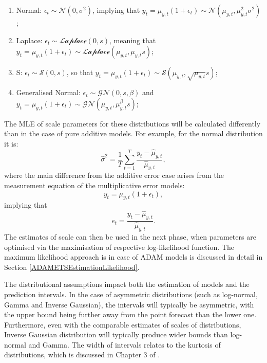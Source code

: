 \documentclass[
]{book}
\providecommand{\tightlist}{%
  \setlength{\itemsep}{0pt}\setlength{\parskip}{0pt}}
\theoremstyle{definition}
\theoremstyle{definition}
\theoremstyle{definition}
\theoremstyle{definition}
\theoremstyle{remark}
\begin{document}
\begin{enumerate}
\def\labelenumi{\arabic{enumi}.}
\tightlist
\item
  Normal: \(\epsilon_t \sim \mathcal{N}(0, \sigma^2)\), implying that \(y_t = \mu_{y,t} (1+\epsilon_t) \sim \mathcal{N}(\mu_{y,t}, \mu_{y,t}^2 \sigma^2)\);
\item
  Laplace: \(\epsilon_t \sim \mathcal{Laplace}(0, s)\), meaning that \(y_t = \mu_{y,t} (1+\epsilon_t) \sim \mathcal{Laplace}(\mu_{y,t}, \mu_{y,t} s)\);
\item
  S: \(\epsilon_t \sim \mathcal{S}(0, s)\), so that \(y_t = \mu_{y,t} (1+\epsilon_t) \sim \mathcal{S}(\mu_{y,t}, \sqrt{\mu_{y,t}} s)\);
\item
  Generalised Normal: \(\epsilon_t \sim \mathcal{GN}(0, s, \beta)\) and \(y_t = \mu_{y,t} (1+\epsilon_t) \sim \mathcal{GN}(\mu_{y,t}, \mu_{y,t}^\beta s)\);
\end{enumerate}

The MLE of scale parameters for these distributions will be calculated differently than in the case of pure additive models. For example, for the normal distribution it is:
\begin{equation}
    \hat{\sigma}^2 = \frac{1}{T}\sum_{t=1}^T \frac{y_t-\hat{\mu}_{y,t}}{\hat{\mu}_{y,t}} ,
    \label{eq:ETSMultiplicativeErrorMLESigmaNormal}
\end{equation}
where the main difference from the additive error case arises from the measurement equation of the multiplicative error models:
\begin{equation}
    y_t = \mu_{y,t} (1+\epsilon_t),
    \label{eq:ETSMultiplicativeErrorMeasurement}
\end{equation}
implying that
\begin{equation}
    e_t = \frac{y_t-\hat{\mu}_{y,t}}{\hat{\mu}_{y,t}}.
    \label{eq:ETSMultiplicativeErrorFormula}
\end{equation}
The estimates of scale can then be used in the next phase, when parameters are optimised via the maximisation of respective log-likelihood function. The maximum likelihood approach is in case of ADAM models is discussed in detail in Section \ref{ADAMETSEstimationLikelihood}.

The distributional assumptions impact both the estimation of models and the prediction intervals. In the case of asymmetric distributions (such as log-normal, Gamma and Inverse Gaussian), the intervals will typically be asymmetric, with the upper bound being further away from the point forecast than the lower one. Furthermore, even with the comparable estimates of scales of distributions, Inverse Gaussian distribution will typically produce wider bounds than log-normal and Gamma. The width of intervals relates to the kurtosis of distributions, which is discussed in Chapter 3 of \citet{SvetunkovSBA}.
\end{document}
